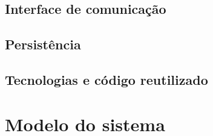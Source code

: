 \subsection{Interface de comunicação}

\subsection{Persistência}

\subsection{Tecnologias e código reutilizado}

\section{Modelo do sistema}

